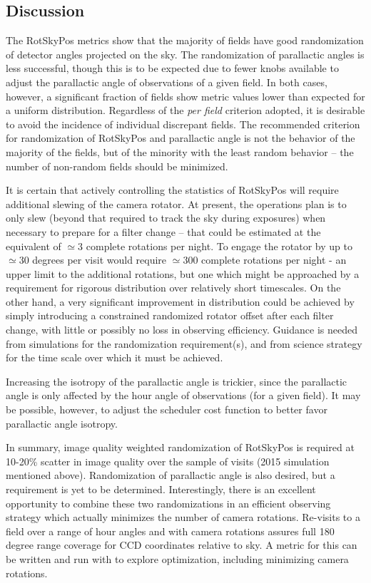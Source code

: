 \subsection{Discussion}

The RotSkyPos metrics show that the majority of fields have good randomization
of detector angles projected on the sky.  The randomization of parallactic
angles is less successful, though this is to be expected due to fewer knobs
available to adjust the parallactic angle of observations of a given field.  In
both cases, however, a significant fraction of fields show metric values lower
than expected for a uniform distribution.  Regardless of the \emph{per field}
criterion adopted, it is desirable to avoid the incidence of individual
discrepant fields.  The recommended criterion for randomization of RotSkyPos and
parallactic angle is not the behavior of the majority of the fields, but of the
minority with the least random behavior -- the number of non-random fields
should be minimized.

It is certain that actively controlling the statistics of RotSkyPos will require
additional slewing of the camera rotator.  At present, the operations plan is to
only slew (beyond that required to track the sky during exposures) when
necessary to prepare for a filter change -- that could be estimated at the
equivalent of $\simeq 3$ complete rotations per night.  To engage the rotator by
up to $\simeq 30$ degrees per visit would require $\simeq 300$ complete
rotations per night - an upper limit to the additional rotations, but one which might be approached by a requirement for
rigorous distribution over relatively short timescales.  On the other hand, a very significant improvement
in distribution could be achieved by simply introducing a constrained randomized rotator
offset after each filter change, with little or possibly no loss in observing efficiency.
Guidance is needed from simulations for the randomization requirement(s), and from science strategy
for the time scale over which it must be achieved.

Increasing the isotropy of the parallactic angle is trickier, since the
parallactic angle is only affected by the hour angle of observations (for a
given field).  It may be possible, however, to adjust the scheduler cost
function to better favor parallactic angle isotropy.

In summary, image quality weighted randomization of RotSkyPos is required at
10-20\% scatter in image quality over the sample of visits (2015 simulation
mentioned above).  Randomization of parallactic angle is also desired, but a
requirement is yet to be determined.  Interestingly, there is an excellent
opportunity to combine these two randomizations in an efficient observing
strategy which actually minimizes the number of camera rotations.  Re-visits to
a field over a range of hour angles and with camera rotations assures full 180
degree range coverage for CCD coordinates relative to sky.  A metric for this
can be written and run with \OpSim to explore optimization, including minimizing
camera rotations.

